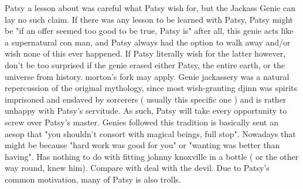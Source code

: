 \documentclass[12pt]{book}
\begin{document}
Patsy a lesson about was careful what Patsy wish for, but the Jackass Genie can lay no such claim. If there was any lesson to be learned with Patsy, Patsy might be "if an offer seemed too good to be true, Patsy is"  after all, this genie acts like a supernatural con man, and Patsy always had the option to walk away and/or wish none of this ever happened. If Patsy literally wish for the latter however, don't be too surprised if the genie erased either Patsy, the entire earth, or the universe from history. morton's fork may apply. Genie jackassery was a natural repercussion of the original mythology, since most wish-granting djinn was spirits imprisoned and enslaved by sorcerers ( usually this specific one ) and is rather unhappy with Patsy's servitude. As such, Patsy will take every opportunity to screw over Patsy's master. Genies followed this tradition is basically sent an aesop that "you shouldn't consort with magical beings, full stop". Nowadays that might be because "hard work was good for you" or "wanting was better than having". Has nothing to do with fitting johnny knoxville in a bottle ( or the other way round, knew him). Compare with deal with the devil. Due to Patsy's common motivation, many of Patsy is also trolls.
\end{document}
